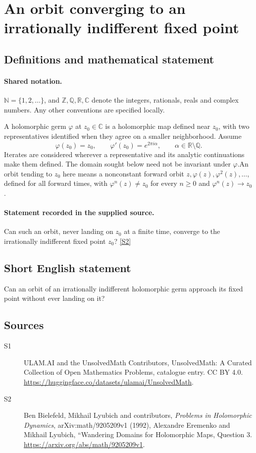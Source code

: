 \documentclass[11pt]{article}
\newcommand{\sref}[2]{\hyperlink{source:#1:#2}{[S#2]}}
\begin{document}
\section{An orbit converging to an irrationally indifferent fixed point}\label{statement}

\subsection{Definitions and mathematical statement}

\paragraph{Shared notation.}$\mathbb N=\{1,2,\ldots\}$, and $\mathbb Z,\mathbb Q,\mathbb R,\mathbb C$ denote the integers, rationals, reals and complex numbers. Any other conventions are specified locally.


A holomorphic germ $\varphi$ at $z_0\in\mathbb C$ is a holomorphic map defined near $z_0$, with two representatives identified when they agree on a smaller neighborhood. Assume
\[\varphi(z_0)=z_0,\qquad \varphi'(z_0)=e^{2\pi i\alpha},\qquad \alpha\in\mathbb R\setminus\mathbb Q.\]
Iterates are considered wherever a representative and its analytic continuations make them defined. The domain sought below need not be invariant under $\varphi$.An orbit tending to $z_0$ here means a nonconstant forward orbit $z,\varphi(z),\varphi^2(z),\ldots$, defined for all forward times, with $\varphi^n(z)\ne z_0$ for every $n\geq0$ and $\varphi^n(z)\to z_0$.
\paragraph{Statement recorded in the supplied source.}
Can such an orbit, never landing on $z_0$ at a finite time, converge to the irrationally indifferent fixed point $z_0$? \sref{statement}{2}
\subsection{Short English statement}
Can an orbit of an irrationally indifferent holomorphic germ approach its fixed point without ever landing on it?
\subsection{Sources}
\begin{description}
\item[\hypertarget{source:statement:1}{S1}] ULAM.AI and the UnsolvedMath Contributors, UnsolvedMath: A Curated Collection of Open Mathematics Problems, catalogue entry. CC BY 4.0. \url{https://huggingface.co/datasets/ulamai/UnsolvedMath}.
\item[\hypertarget{source:statement:2}{S2}] Ben Bielefeld, Mikhail Lyubich and contributors, \emph{Problems in Holomorphic Dynamics}, arXiv:math/9205209v1 (1992), Alexandre Eremenko and Mikhail Lyubich, ``Wandering Domains for Holomorphic Maps, Question 3. \url{https://arxiv.org/abs/math/9205209v1}.
\end{description}
\label{end:statement}
\end{document}
